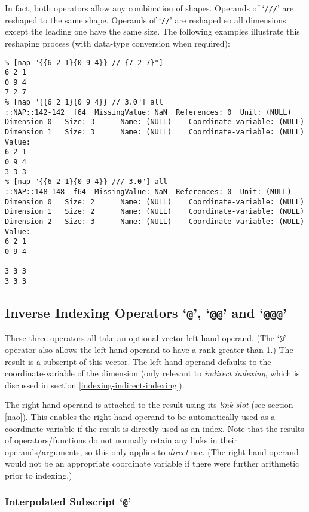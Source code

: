   
 In fact, both operators allow any combination of shapes. Operands
  of `\texttt{///}' are reshaped to the same shape. Operands of
  `\texttt{//}' are reshaped so all dimensions except the
  leading one have the same size. The following examples illustrate
  this reshaping process (with data-type conversion when required):
  \begin{verbatim}
% [nap "{{6 2 1}{0 9 4}} // {7 2 7}"]
6 2 1
0 9 4
7 2 7
% [nap "{{6 2 1}{0 9 4}} // 3.0"] all
::NAP::142-142  f64  MissingValue: NaN  References: 0  Unit: (NULL)
Dimension 0   Size: 3      Name: (NULL)    Coordinate-variable: (NULL)
Dimension 1   Size: 3      Name: (NULL)    Coordinate-variable: (NULL)
Value:
6 2 1
0 9 4
3 3 3
% [nap "{{6 2 1}{0 9 4}} /// 3.0"] all
::NAP::148-148  f64  MissingValue: NaN  References: 0  Unit: (NULL)
Dimension 0   Size: 2      Name: (NULL)    Coordinate-variable: (NULL)
Dimension 1   Size: 2      Name: (NULL)    Coordinate-variable: (NULL)
Dimension 2   Size: 3      Name: (NULL)    Coordinate-variable: (NULL)
Value:
6 2 1
0 9 4

3 3 3
3 3 3
\end{verbatim}

\subsection{Inverse Indexing Operators `\texttt{@}', `\texttt{@@}' and `\texttt{@@@}'}
    \label{op-Inverse-Indexing}

  These three operators all take an optional vector left-hand
  operand. (The `\texttt{@}' operator also allows the left-hand operand to
  have a rank greater than 1.) The result is a subscript of this
  vector.
The left-hand operand defaults to the coordinate-variable of
  the dimension
(only relevant to 
{\em indirect indexing}, which is discussed in section \ref{indexing-indirect-indexing}).
  
 The right-hand operand is attached to the result using its {\em link slot}
  (see section \ref{nao}).
This enables the right-hand operand to be automatically used as
  a coordinate variable if the result is directly used as an index.
  Note that the results of operators/functions do not normally retain
  any links in their operands/arguments, so this only applies to 
  \textit{direct} use. (The right-hand operand would not be an
  appropriate coordinate variable if there were further arithmetic
  prior to indexing.)

\subsubsection{Interpolated Subscript `\texttt{@}'}
    \label{op-Interpolated-Subscript}

